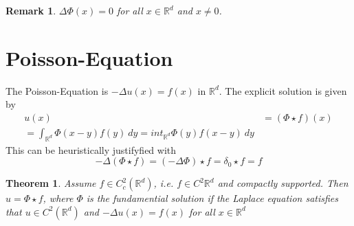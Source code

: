 \documentclass{report}
\theoremstyle{tommy}
\newtheorem{thm}[defn]{Theorem}
\newtheorem{rem}[defn]{Remark}
\begin{document}
\begin{rem}
  \(\Delta \Phi(x) = 0\) for all \(x \in \mathbb{R}^d\) and \(x \ne 0\). 
\end{rem}


\section{Poisson-Equation}
The Poisson-Equation is \(-\Delta u(x) = f(x)\) in \(\mathbb{R}^d\). The explicit solution is given by
\begin{align*}
  u(x) &= (\Phi \star f)(x) \\
  = \int_{\mathbb{R}^d} \Phi(x-y)f(y) \ dy 
  = int_{\mathbb{R}^d} \Phi(y)f(x-y) \ dy
\end{align*}
This can be heuristically justifyfied with \[-\Delta (\Phi \star f) = (-\Delta \Phi) \star f = \delta_0 \star f = f\]


\begin{thm}
  Assume \(f \in C_c^2(\mathbb{R}^d)\), i.e. \(f \in C^2{\mathbb{R}^d}\) and compactly supported. Then \(u = \Phi \star f\), where \(\Phi\) is the fundamential solution if the Laplace equation satisfies that \(u \in C^2(\mathbb{R}^d)\) and \(- \Delta u(x) = f(x)\) for all \(x \in \mathbb{R}^d\)
\end{thm}
\end{document}
